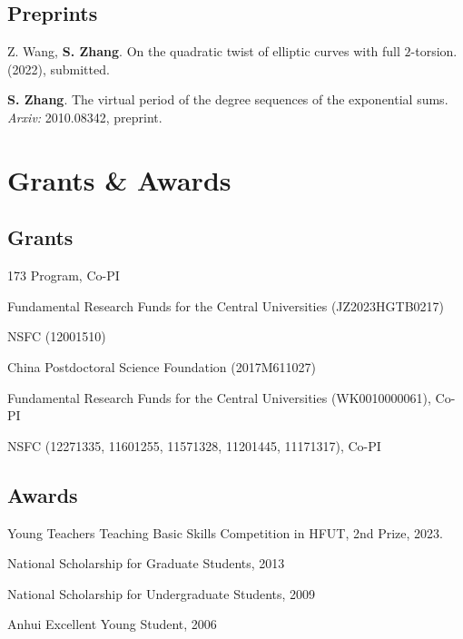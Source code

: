 \documentclass[11pt]{article}
\begin{document}
\subsection{Preprints}
\begin{cvlist}

	\item Z. Wang, \textbf{S. Zhang}.
	On the quadratic twist of elliptic curves with full $2$-torsion.
	(2022), submitted.

	\item \textbf{S. Zhang}.
	The virtual period of the degree sequences of the exponential sums.
	{\em Arxiv:} 2010.08342, preprint.
\end{cvlist}


\section{Grants \& Awards}
\subsection{Grants}
\begin{cvlist}
	\item 173 Program, Co-PI
	\item Fundamental Research Funds for the Central Universities (JZ2023HGTB0217)
	\item NSFC (12001510)
	\item China Postdoctoral Science Foundation (2017M611027)
	\item Fundamental Research Funds for the Central Universities (WK0010000061), Co-PI
	\item NSFC (12271335, 11601255, 11571328, 11201445, 11171317), Co-PI
\end{cvlist}


\subsection{Awards}
\begin{cvlist}
	\item Young Teachers Teaching Basic Skills Competition in HFUT, 2nd Prize, 2023.
	\item National Scholarship for Graduate Students, 2013
	\item National Scholarship for Undergraduate Students, 2009
	\item Anhui Excellent Young Student, 2006
\end{cvlist}
\end{document}
